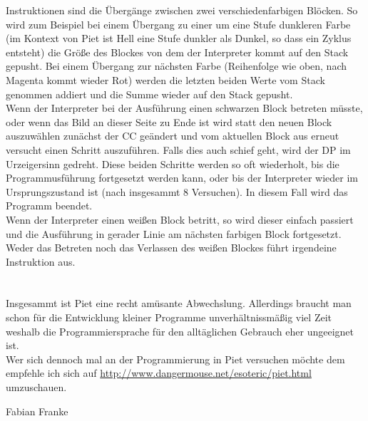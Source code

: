 {    Instruktionen sind die Übergänge zwischen zwei verschiedenfarbigen Blöcken.
    So wird zum Beispiel bei einem Übergang zu einer um eine Stufe dunkleren
    Farbe (im Kontext von Piet ist \glqq{}Hell\grqq{} eine Stufe dunkler als \glqq{}Dunkel\grqq{}, so dass
    ein Zyklus entsteht) die Größe des Blockes von dem der Interpreter kommt auf den
    Stack gepusht.
    Bei einem Übergang zur nächsten Farbe (Reihenfolge wie oben, nach Magenta
    kommt wieder Rot) werden die letzten beiden Werte vom Stack genommen addiert
    und die Summe wieder auf den Stack gepusht.\vspace{5em}\\

    Wenn der Interpreter bei der Ausführung einen schwarzen Block betreten
    müsste, oder wenn das Bild an dieser Seite zu Ende ist wird statt den neuen
    Block auszuwählen zunächst der CC geändert und vom aktuellen Block aus erneut
    versucht einen Schritt auszuführen. Falls dies auch schief geht, wird der DP
    im Urzeigersinn gedreht. Diese beiden Schritte werden so oft wiederholt, bis
    die Programmusführung fortgesetzt werden kann, oder bis der Interpreter
    wieder im Ursprungszustand ist (nach insgesammt 8 Versuchen). In diesem Fall
    wird das Programm beendet.\\

    Wenn der Interpreter einen weißen Block betritt, so wird dieser einfach
    passiert und die Ausführung in gerader Linie am nächsten farbigen Block
    fortgesetzt. Weder das Betreten noch das Verlassen des weißen Blockes führt
    irgendeine Instruktion aus.\\

    ~\\~\\
    Insgesammt ist Piet eine recht amüsante Abwechslung. Allerdings braucht man
    schon für die Entwicklung kleiner Programme unverhältnissmäßig viel Zeit
    weshalb die Programmiersprache für den alltäglichen Gebrauch eher ungeeignet
    ist.\\
    Wer sich dennoch mal an der Programmierung in Piet versuchen möchte dem
    empfehle ich sich auf \url{http://www.dangermouse.net/esoteric/piet.html}
    umzuschauen.

}
{Fabian Franke}
